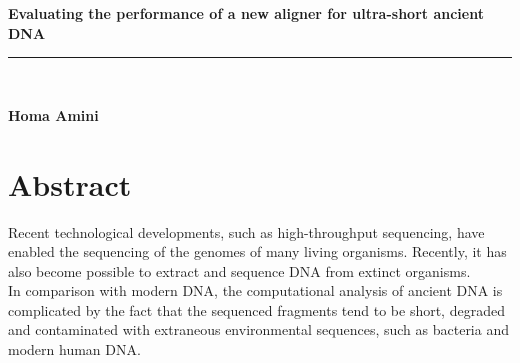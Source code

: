 \documentclass[11pt,a4paper]{report}
\makeatletter
\newcommand{\at}{\makeatletter @\makeatother}
\newcommand{\HRule}{\rule{\linewidth}{0.5mm}}
\makeatother
\begin{document}

\begin{titlepage}
\begin{center}
{ \huge \bfseries \textbf{ Evaluating the performance of a new aligner for ultra-short ancient DNA }}\\[0.4cm]
\HRule \\[0.5cm]
\begin{minipage}{0.9\textwidth}
\begin{flushleft} \large
{\textbf{Homa Amini}}\\
\end{flushleft}
\end{minipage}
\vfill
\end{center}
\end{titlepage}

\newpage\null\thispagestyle{empty}\newpage
\newpage
\newpage

\section*{Abstract}

Recent technological developments, such as high-throughput sequencing,
have enabled the sequencing of the genomes of many living organisms.  Recently, it has also become possible to extract and sequence DNA from extinct organisms.\\ 
In comparison with modern DNA, the computational analysis of ancient DNA is complicated
by the fact that the sequenced fragments tend to be short, degraded and contaminated with
extraneous environmental sequences, such as bacteria and modern human DNA.
\end{document}
